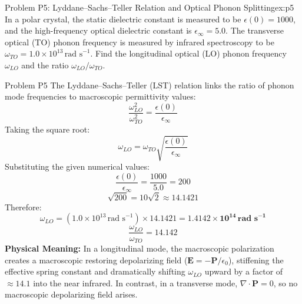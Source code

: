 \documentclass[11pt,a4paper]{article}
\begin{document}
\newpage

\begin{examplebox}{Problem P5: Lyddane--Sachs--Teller Relation and Optical Phonon Splitting}{ex:p5}
In a polar crystal, the static dielectric constant is measured to be $\epsilon(0) = 1000$, and the high-frequency optical dielectric constant is $\epsilon_\infty = 5.0$. The transverse optical (TO) phonon frequency is measured by infrared spectroscopy to be $\omega_{TO} = 1.0 \times 10^{13}\,\text{rad s}^{-1}$.
Find the longitudinal optical (LO) phonon frequency $\omega_{LO}$ and the ratio $\omega_{LO}/\omega_{TO}$.
\end{examplebox}

\begin{solbox}{Problem P5}
The Lyddane--Sachs--Teller (LST) relation links the ratio of phonon mode frequencies to macroscopic permittivity values:
\begin{equation}
    \frac{\omega_{LO}^2}{\omega_{TO}^2} = \frac{\epsilon(0)}{\epsilon_\infty}
\end{equation}
Taking the square root:
\begin{equation}
    \omega_{LO} = \omega_{TO} \sqrt{\frac{\epsilon(0)}{\epsilon_\infty}}
\end{equation}
Substituting the given numerical values:
\begin{equation}
    \frac{\epsilon(0)}{\epsilon_\infty} = \frac{1000}{5.0} = 200
\end{equation}
\begin{equation}
    \sqrt{200} = 10\sqrt{2} \approx 14.1421
\end{equation}
Therefore:
\begin{equation}
    \omega_{LO} = (1.0 \times 10^{13}\,\text{rad s}^{-1}) \times 14.1421 = \mathbf{1.4142 \times 10^{14}\,\text{rad s}^{-1}}
\end{equation}
\begin{equation}
    \frac{\omega_{LO}}{\omega_{TO}} = \mathbf{14.142}
\end{equation}
\textbf{Physical Meaning:}
In a longitudinal mode, the macroscopic polarization creates a macroscopic restoring depolarizing field ($\mathbf{E} = -\mathbf{P}/\epsilon_0$), stiffening the effective spring constant and dramatically shifting $\omega_{LO}$ upward by a factor of $\approx 14.1$ into the near infrared. In contrast, in a transverse mode, $\nabla \cdot \mathbf{P} = 0$, so no macroscopic depolarizing field arises.
\end{solbox}
\end{document}
